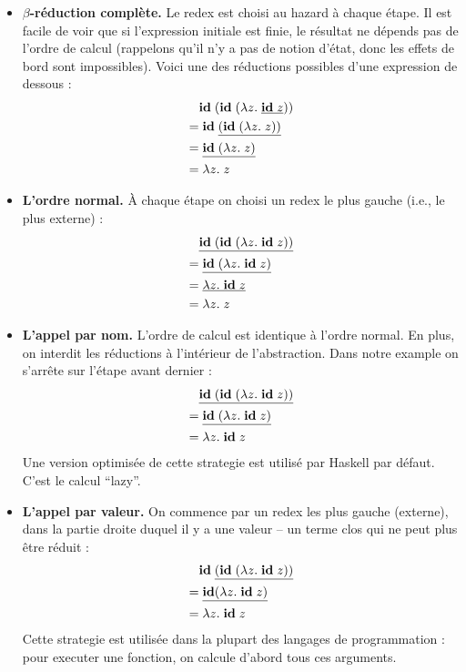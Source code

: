 \begin{itemize}
	\item \textbf{$\beta$-réduction complète.}
		Le redex est choisi au hazard à chaque étape. Il est facile de voir que si l'expression initiale est finie, le résultat ne dépends pas de l'ordre de calcul (rappelons qu'il n'y a pas de notion d'état, donc les effets de bord sont impossibles).
		Voici une des réductions possibles d'une expression de dessous :
		\begin{align*}
			& \mathbf{id} \; (\mathbf{id} \; (\lambda z. \; \underline{\mathbf{id} \; z})) \\
			= & \; \mathbf{id} \; \underline{(\mathbf{id} \; (\lambda z. \; z))} \\
			= & \; \underline{\mathbf{id} \; (\lambda z. \; z)} \\
			= & \; \lambda z. \; z
		\end{align*}
	\item \textbf{L'ordre normal.}
		À chaque étape on choisi un redex le plus gauche (i.e., le plus externe) :
		\begin{align*}
			& \underline{\mathbf{id} \; (\mathbf{id} \; (\lambda z. \; \mathbf{id} \; z))} \\
			= & \; \underline{\mathbf{id} \; (\lambda z. \; \mathbf{id} \; z)} \\
			= & \; \underline{\lambda z. \; \mathbf{id} \; z} \\
			= & \; \lambda z. \; z
		\end{align*}		
	\item \textbf{L'appel par nom.}
		L'ordre de calcul est identique à l'ordre normal. En plus, on interdit les réductions à l'intérieur de l'abstraction. Dans notre example on s'arrête sur l'étape avant dernier :
		\begin{align*}
			& \underline{\mathbf{id} \; (\mathbf{id} \; (\lambda z. \; \mathbf{id} \; z))} \\
			= & \; \underline{\mathbf{id} \; (\lambda z. \; \mathbf{id} \; z)} \\
			= & \; \lambda z. \; \mathbf{id} \; z
		\end{align*}
		Une version optimisée de cette strategie est utilisé par Haskell par défaut.
		C'est le calcul ``lazy''.
	\item \textbf{L'appel par valeur.}
		On commence par un redex les plus gauche (externe), dans la partie droite duquel il y a une valeur -- un terme clos qui ne peut plus être réduit :
		\begin{align*}
			& \mathbf{id} \; \underline{(\mathbf{id} \; (\lambda z. \; \mathbf{id} \; z))} \\
			= & \; \underline{\mathbf{id} (\lambda z. \; \mathbf{id} \; z)} \\
			= & \; \lambda z. \; \mathbf{id} \; z
		\end{align*}
		Cette strategie est utilisée dans la plupart des langages de programmation : pour executer une fonction, on calcule d'abord tous ces arguments.
\end{itemize}
